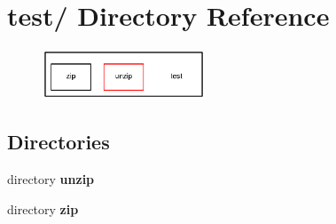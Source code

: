 \section{test/ Directory Reference}
\label{dir_d72eaf431c8ab2446754c0091103dfa0}


\nopagebreak
\begin{figure}[H]
\begin{center}
\leavevmode
\includegraphics[width=137pt]{dir_d72eaf431c8ab2446754c0091103dfa0_dep}
\end{center}
\end{figure}
\subsection*{Directories}
\begin{CompactItemize}
\item 
directory {\bf unzip}
\item 
directory {\bf zip}
\end{CompactItemize}
